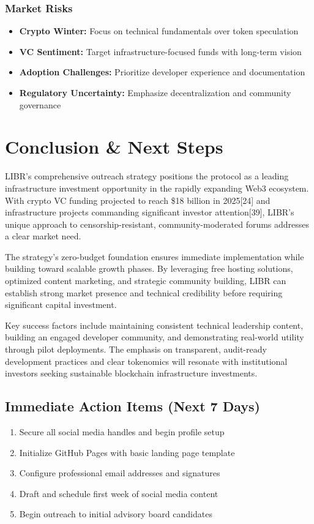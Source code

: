 \documentclass[12pt,a4paper]{article}
\begin{document}
\subsubsection{Market Risks}
\begin{itemize}
    \item \textbf{Crypto Winter:} Focus on technical fundamentals over token speculation
    \item \textbf{VC Sentiment:} Target infrastructure-focused funds with long-term vision
    \item \textbf{Adoption Challenges:} Prioritize developer experience and documentation
    \item \textbf{Regulatory Uncertainty:} Emphasize decentralization and community governance
\end{itemize}

\section{Conclusion \& Next Steps}

LIBR's comprehensive outreach strategy positions the protocol as a leading infrastructure investment opportunity in the rapidly expanding Web3 ecosystem. With crypto VC funding projected to reach \$18 billion in 2025[24] and infrastructure projects commanding significant investor attention[39], LIBR's unique approach to censorship-resistant, community-moderated forums addresses a clear market need.

The strategy's zero-budget foundation ensures immediate implementation while building toward scalable growth phases. By leveraging free hosting solutions, optimized content marketing, and strategic community building, LIBR can establish strong market presence and technical credibility before requiring significant capital investment.

Key success factors include maintaining consistent technical leadership content, building an engaged developer community, and demonstrating real-world utility through pilot deployments. The emphasis on transparent, audit-ready development practices and clear tokenomics will resonate with institutional investors seeking sustainable blockchain infrastructure investments.

\subsection{Immediate Action Items (Next 7 Days)}
\begin{enumerate}
    \item Secure all social media handles and begin profile setup
    \item Initialize GitHub Pages with basic landing page template
    \item Configure professional email addresses and signatures
    \item Draft and schedule first week of social media content
    \item Begin outreach to initial advisory board candidates
\end{enumerate}
\end{document}
